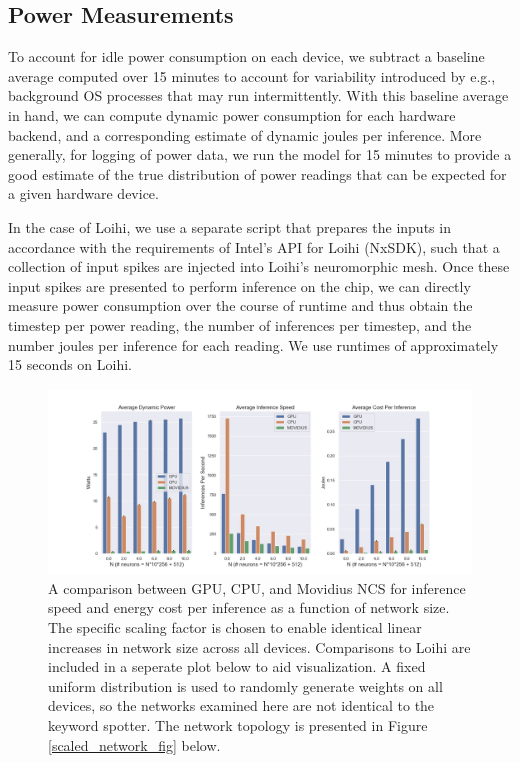 \documentclass[sigconf, screen]{acmart}
\begin{document}
\subsection{Power Measurements}

To account for idle power consumption on each device, we subtract a baseline average computed over 15 minutes to account for variability introduced by e.g., background OS processes that may run intermittently. With this baseline average in hand, we can compute dynamic power consumption for each hardware backend, and a corresponding estimate of dynamic joules per inference. More generally, for logging of power data, we run the model for 15 minutes to provide a good estimate of the true distribution of power readings that can be expected for a given hardware device.

In the case of Loihi, we use a separate script that prepares the inputs in accordance with the requirements of Intel's API for Loihi (NxSDK), such that a collection of input spikes are injected into Loihi's neuromorphic mesh. Once these input spikes are presented to perform inference on the chip, we can directly measure power consumption over the course of runtime and thus obtain the timestep per power reading, the number of inferences per timestep, and the number joules per inference for each reading. We use runtimes of approximately 15 seconds on Loihi.

\begin{figure}[ht!]
\centering
    \includegraphics[width=6.5in]{./figures/comp_summary.png}
	\caption{A comparison between GPU, CPU, and Movidius NCS for inference speed and energy cost per inference as a function of network size. The specific scaling factor is chosen to enable identical linear increases in network size across all devices. Comparisons to Loihi are included in a seperate plot below to aid visualization. A fixed uniform distribution is used to randomly generate weights on all devices, so the networks examined here are not identical to the keyword spotter. The network topology is presented in Figure \ref{scaled_network_fig} below.}
\label{comp_fig}
\end{figure}
\end{document}
